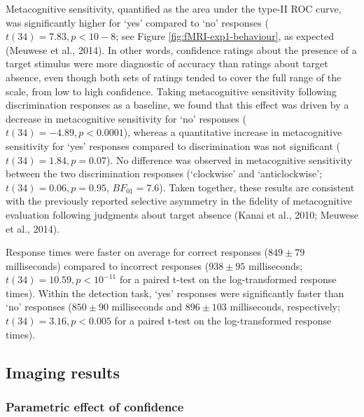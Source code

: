 \documentclass[12pt,twoside]{reedthesis}
\begin{document}
Metacognitive sensitivity, quantified as the area under the type-II ROC curve, was significantly higher for `yes' compared to `no' responses (\(t(34) = 7.83, p<10-8\); see Figure \ref{fig:fMRI-exp1-behaviour}, as expected (Meuwese et al., 2014). In other words, confidence ratings about the presence of a target stimulus were more diagnostic of accuracy than ratings about target absence, even though both sets of ratings tended to cover the full range of the scale, from low to high confidence. Taking metacognitive sensitivity following discrimination responses as a baseline, we found that this effect was driven by a decrease in metacognitive sensitivity for `no' responses (\(t(34) = -4.89, p<0.0001\)), whereas a quantitative increase in metacognitive sensitivity for `yes' responses compared to discrimination was not significant (\(t(34)=1.84, p=0.07\)). No difference was observed in metacognitive sensitivity between the two discrimination responses (`clockwise' and `anticlockwise'; \(t(34) = 0.06, p=0.95\), \(BF_{01}=7.6\)). Taken together, these results are consistent with the previously reported selective asymmetry in the fidelity of metacognitive evaluation following judgments about target absence (Kanai et al., 2010; Meuwese et al., 2014).

Response times were faster on average for correct responses (\(849 \pm 79\) milliseconds) compared to incorrect responses (\(938 \pm 95\) milliseconds; \(t(34)=10.59, p<10^{-11}\) for a paired t-test on the log-transformed response times). Within the detection task, `yes' responses were significantly faster than `no' responses (\(850 \pm 90\) milliseconds and \(896 \pm 103\) milliseconds, respectively; \(t(34)=3.16, p<0.005\) for a paired t-test on the log-transformed response times).

\hypertarget{imaging-results}{%
\subsection{Imaging results}\label{imaging-results}}

\hypertarget{parametric-effect-of-confidence}{%
\subsubsection*{Parametric effect of confidence}\label{parametric-effect-of-confidence}}
\end{document}
